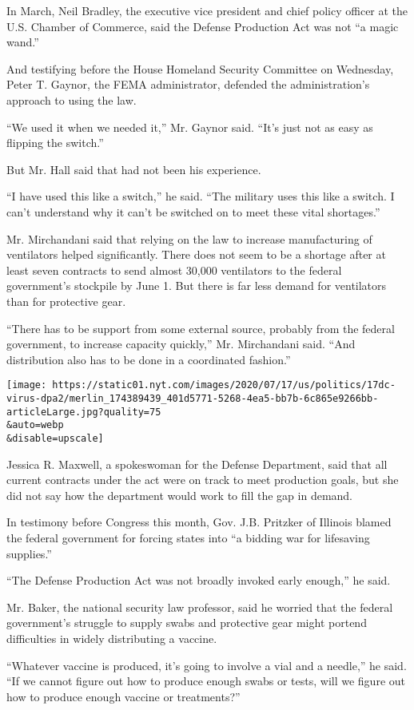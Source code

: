 In March, Neil Bradley, the executive vice president and chief policy
officer at the U.S. Chamber of Commerce, said the Defense Production Act
was not ``a magic wand.''

And testifying before the House Homeland Security Committee on
Wednesday, Peter T. Gaynor, the FEMA administrator, defended the
administration's approach to using the law.

``We used it when we needed it,'' Mr. Gaynor said. ``It's just not as
easy as flipping the switch.''

But Mr. Hall said that had not been his experience.

``I have used this like a switch,'' he said. ``The military uses this
like a switch. I can't understand why it can't be switched on to meet
these vital shortages.''

Mr. Mirchandani said that relying on the law to increase manufacturing
of ventilators helped significantly. There does not seem to be a
shortage after at least seven contracts to send almost 30,000
ventilators to the federal government's stockpile by June 1. But there
is far less demand for ventilators than for protective gear.

``There has to be support from some external source, probably from the
federal government, to increase capacity quickly,'' Mr. Mirchandani
said. ``And distribution also has to be done in a coordinated fashion.''

\texttt{[image: https://static01.nyt.com/images/2020/07/17/us/politics/17dc-virus-dpa2/merlin\_174389439\_401d5771-5268-4ea5-bb7b-6c865e9266bb-articleLarge.jpg?quality=75\\\&auto=webp\\\&disable=upscale]}

Jessica R. Maxwell, a spokeswoman for the Defense Department, said that
all current contracts under the act were on track to meet production
goals, but she did not say how the department would work to fill the gap
in demand.

In testimony before Congress this month, Gov. J.B. Pritzker of Illinois
blamed the federal government for forcing states into ``a bidding war
for lifesaving supplies.''

``The Defense Production Act was not broadly invoked early enough,'' he
said.

Mr. Baker, the national security law professor, said he worried that the
federal government's struggle to supply swabs and protective gear might
portend difficulties in widely distributing a vaccine.

``Whatever vaccine is produced, it's going to involve a vial and a
needle,'' he said. ``If we cannot figure out how to produce enough swabs
or tests, will we figure out how to produce enough vaccine or
treatments?''

